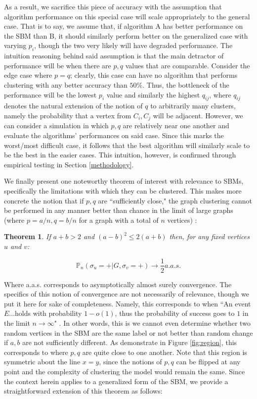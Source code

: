 \documentclass{article}
\newtheorem{theorem}{Theorem}[section]
\begin{document}
As a result, we sacrifice this piece of accuracy with the assumption that algorithm performance on this special case will scale appropriately to the general case. That is to say, we assume that, if algorithm A has better performance on the SBM than B, it should similarly perform better on the generalized case with varying $p_i$, though the two very likely will have degraded performance. The intuition reasoning behind said assumption is that the main detractor of performance will be when there are $p,q$ values that are comparable. Consider the edge case where $p=q$; clearly, this case can have no algorithm that performs clustering with any better accuracy than $50\%$. Thus, the bottleneck of the performance will be the lowest $p_i$ value and similarly the highest $q_{ij}$, where $q_{ij}$ denotes the natural extension of the notion of $q$ to arbitrarily many clusters, namely the probability that a vertex from $C_i,C_j$ will be adjacent. However, we can consider a simulation in which $p,q$ are relatively near one another and evaluate the algorithms' performances on said case. Since this marks the worst/most difficult case, it follows that the best algorithm will similarly scale to be the best in the easier cases. This intuition, however, is confirmed through empirical testing in Section \ref{methodology}.

We finally present one noteworthy theorem of interest with relevance to SBMs, specifically the limitations with which they can be clustered. This makes more concrete the notion that if $p,q$ are ``sufficiently close," the graph clustering cannot be performed in any manner better than chance in the limit of large graphs (where $p=a/n,q=b/n$ for a graph with a total of $n$ vertices) \cite{sbm}:

\begin{theorem}
If $a + b > 2$ and $(a-b)^2\le2(a+b)$ then, for any fixed vertices $u$ and $v$:

$$ \mathbb{P}_n(\sigma_u = + | G, \sigma_v = +) \rightarrow \frac{1}{2} a.a.s. $$
\end{theorem}

Where a.a.s. corresponds to asymptotically almost surely convergence. The specifics of this notion of convergence are not necessarily of relevance, though we put it here for sake of completeness. Namely, this corresponds to when ``An event $E$...holds with probability $1-o(1)$, thus the probability of success goes to $1$ in the limit $n\rightarrow\infty$" \cite{terry}. In other words, this is we cannot even determine whether two random vertices in the SBM are the same label or not better than random change if $a,b$ are not sufficiently different. As demonstrate in Figure \ref{fig:region}, this corresponds to where $p,q$ are quite close to one another. Note that this region is symmetric about the line $x=y$, since the notions of $p,q$ can be flipped at any point and the complexity of clustering the model would remain the same. Since the context herein applies to a generalized form of the SBM, we provide a straightforward extension of this theorem as follows:
\end{document}

